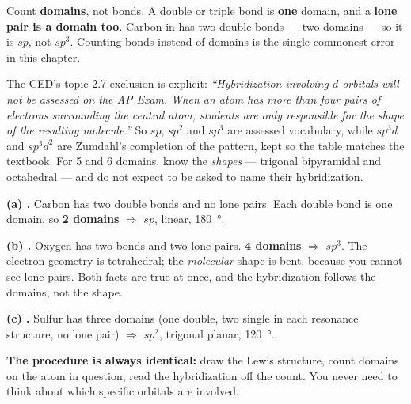 \documentclass{apchem-worksheet}
\begin{document}
\begin{apctrap}
Count \textbf{domains}, not bonds. A double or triple bond is
\textbf{one} domain, and a \textbf{lone pair is a domain too}. Carbon in
 has two double bonds --- two domains --- so it is $sp$, not
$sp^{3}$. Counting bonds instead of domains is the single commonest
error in this chapter.
\end{apctrap}

\begin{apcnote}
The CED's topic 2.7 exclusion is explicit: \emph{``Hybridization
involving $d$ orbitals will not be assessed on the AP Exam. When an atom
has more than four pairs of electrons surrounding the central atom,
students are only responsible for the shape of the resulting
molecule.''} So $sp$, $sp^{2}$ and $sp^{3}$ are assessed vocabulary,
while $sp^{3}d$ and $sp^{3}d^{2}$ are Zumdahl's completion of the
pattern, kept so the table matches the textbook. For 5 and 6 domains,
know the \emph{shapes} --- trigonal bipyramidal and octahedral --- and
do not expect to be asked to name their hybridization.
\end{apcnote}

\begin{workedexample}
\textbf{(a) .} Carbon has two double bonds and no lone pairs.
Each double bond is one domain, so \textbf{2 domains} $\Rightarrow$
\textbf{$sp$}, linear, \SI{180}{\degree}.

\textbf{(b) .} Oxygen has two bonds and two lone pairs.
\textbf{4 domains} $\Rightarrow$ \textbf{$sp^{3}$}. The electron geometry
is tetrahedral; the \emph{molecular} shape is bent, because you cannot
see lone pairs. Both facts are true at once, and the hybridization
follows the domains, not the shape.

\textbf{(c) .} Sulfur has three domains (one double, two single
in each resonance structure, no lone pair) $\Rightarrow$
\textbf{$sp^{2}$}, trigonal planar, \SI{120}{\degree}.

\textbf{The procedure is always identical:} draw the Lewis structure,
count domains on the atom in question, read the hybridization off the
count. You never need to think about which specific orbitals are
involved.
\end{workedexample}
\end{document}
